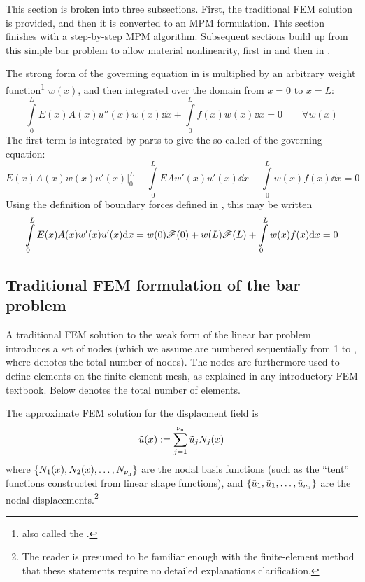 This section is broken into three subsections. First, the traditional FEM solution is provided, and then it is converted to an MPM formulation. This section finishes with a step-by-step MPM algorithm.  Subsequent sections build up from this simple \oneD bar problem to allow material nonlinearity, first in \oneD and then in \twoD.


The strong form of the governing equation in  is multiplied by an arbitrary weight function\footnote{also called the .} $w(x)$, and then integrated over the domain from $x=0$ to $x=L$:
\begin{equation}
  \int\limits_0^L E(x)A(x) u''(x)w(x)\dd x  +  \int\limits_0^L f(x)w(x)\dd x=0
\qquad\forall w(x)
\end{equation}
The first term is integrated by parts to give the so-called  of the governing equation:
\begin{equation}
  E(x)A(x) w(x)u'(x)\big|_0^L-\int\limits_0^L EA w'(x)u'(x)\dd x  +  \int\limits_0^L w(x)f(x)\dd x=0
\label{eq:LinearBarWeakForm}
\end{equation}
Using the definition of boundary forces defined in , this may be written
\begin{equation}
 \int\limits_0^L E(x)A(x) w'(x)u'(x)\mathrm{d} x = w(0)\mathscr{F}(0)+w(L)\mathscr{F}(L)  +  \int\limits_0^L w(x)f(x)\mathrm{d} x=0
\label{eq:LinearBarWeakFormWithForcesc}
\end{equation}




\subsection{Traditional FEM formulation of the bar problem}
\label{sec:LinearBarFEM}
A traditional FEM solution to the weak form of the linear bar problem introduces a set of nodes (which we assume are numbered sequentially from 1 to \numnodes, where \numnodes denotes the total number of nodes).  The nodes are furthermore used to define elements on the finite-element mesh, as explained in any introductory FEM textbook.  Below \numelements denotes the total number of elements.
 
The approximate FEM solution for the displacment field is
\begin{equation}
  \tilde{u}(x):=\sum\limits_{j=1}^{{\nu_\text{n}}}\tilde{u}_j {N}_j(x)
\label{eq:aprxuc}
\end{equation}
where $\{{N}_1(x),{N}_2(x),\ldots,{N}_{\nu_\text{n}}\}$ are the nodal basis functions (such as the ``tent'' functions constructed from linear shape functions), and $\{\tilde{u}_1, \tilde{u}_1, \ldots, \tilde{u}_{\nu_\text{n}}\}$  
are the nodal displacements.\footnote{The reader is presumed to be familiar enough with the finite-element method that these statements require no detailed explanations clarification.}

